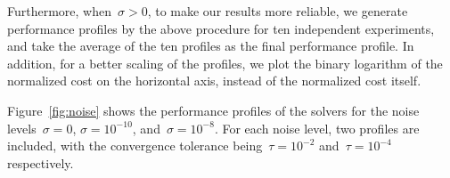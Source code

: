 \documentclass[
    smallextended,  %
    final,        %
]{svjour3}
\newcommand{\obj}{f}
\begin{document}
Furthermore, when~$\sigma > 0$, to make our results more reliable,
we generate performance profiles by the above procedure for ten independent experiments, and
take the average of the ten profiles as the final performance profile. In addition, for a better
scaling of the profiles, we plot the binary logarithm of the normalized cost on the horizontal axis, instead of the normalized cost itself.


Figure~\ref{fig:noise} shows the performance profiles of the solvers for the noise levels~$\sigma = 0$, $\sigma = 10^{-10}$,  and~$\sigma = 10^{-8}$.
For each noise level, two profiles are included, with the convergence tolerance being~$\tau = 10^{-2}$ and~$\tau = 10^{-4}$ respectively.


\end{document}
